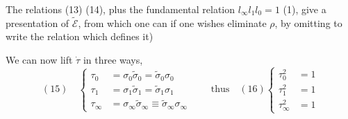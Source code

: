 The relations (13) (14), plus the fundamental relation $l_\infty l_1l_0=1$ (1), give a presentation of $\tilde{\mathcal E}$, from which one can if one wishes eliminate $\rho$, \unsure{(}by omitting to write the relation which defines it)

We can now lift $\dot\tau$ in three ways, 
\[
(15)\quad\left\{\begin{aligned}
\tau_0&=\sigma_0\tilde\sigma_0=\tilde\sigma_0\sigma_0\\
\tau_1&=\sigma_1\tilde\sigma_1=\tilde\sigma_1\sigma_1\\
\tau_\infty&=\sigma_\infty\tilde\sigma_\infty\equiv\tilde\sigma_\infty\sigma_\infty
\end{aligned}\right.
\qquad\text{thus}\quad(16)\left\{\begin{aligned}
\tau_0^2&=1\\\tau_1^2&=1\\\tau_\infty^2&=1
\end{aligned}\right.
\]
